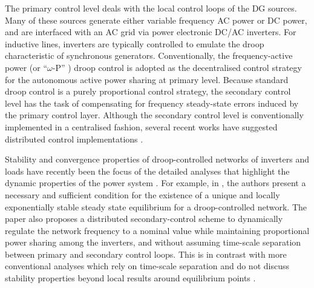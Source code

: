 \documentclass[letter, 10pt, conference]{ieeeconf}
\newcommand{\1}{\mathbf{1}}
\newcommand{\0}{\mathbf{0}}
\begin{document}
The primary control level deals with the local control loops of the DG
sources.  Many of these sources generate either variable frequency AC
power or DC power, and are interfaced with an AC grid via power
electronic DC/AC inverters.  For inductive lines, inverters are
typically controlled to emulate the droop characteristic of
synchronous generators.  Conventionally, the frequency-active power
(or ``$\omega$-P'' ) droop control \cite{CDA93} is adopted as the
decentralised control strategy for the autonomous active power sharing
at primary level.  Because standard droop control is a purely
proportional control strategy, the secondary control level has the
task of compensating for frequency steady-state errors induced by the
primary control layer.  Although the secondary control level is
conventionally implemented in a centralised fashion, several recent
works have suggested distributed control implementations
\cite{SVG12,ASDJ12,SATS12}.

Stability and convergence properties of droop-controlled networks of
inverters and loads have recently been the focus of the detailed
analyses that highlight the dynamic properties of the power system
\cite{AiG13,ASDJ12,JWSP-FD-FB:12u}.
For example, in \cite{JWSP-FD-FB:12u}, the authors present a necessary 
and sufficient condition for the existence of a unique and locally
exponentially stable steady state equilibrium for a droop-controlled
network.  The paper also proposes a distributed secondary-control
scheme to dynamically regulate the network frequency to a nominal
value while maintaining proportional power sharing among the
inverters, and without assuming time-scale separation between primary
and secondary control loops.  This is in contrast with more
conventional analyses which rely on time-scale separation and do not
discuss stability properties beyond local results around equilibrium
points \cite{JWSP-FD-FB:12u}.
\end{document}
